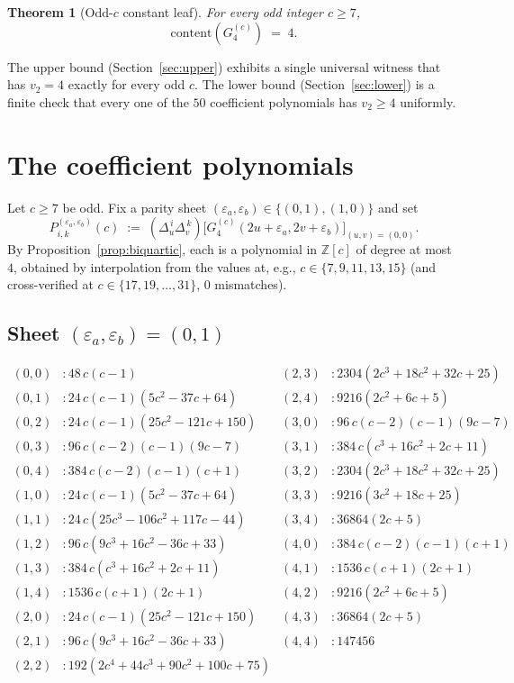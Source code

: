 \documentclass[11pt]{article}
\newtheorem{theorem}{Theorem}
\begin{document}
\begin{theorem}[Odd-$c$ constant leaf]\label{thm:main}
For every odd integer $c \ge 7$,
\[
  \mathrm{content}(G_4^{(c)}) \;=\; 4.
\]
\end{theorem}

The upper bound (Section~\ref{sec:upper}) exhibits a single universal witness
that has $v_2 = 4$ exactly for every odd $c$. The lower bound
(Section~\ref{sec:lower}) is a finite check that every one of the $50$
coefficient polynomials has $v_2 \ge 4$ uniformly.

\section{The coefficient polynomials}\label{sec:coeffs}

Let $c \ge 7$ be odd. Fix a parity sheet
$(\varepsilon_a, \varepsilon_b) \in \{(0,1), (1,0)\}$ and set
\[
  P^{(\varepsilon_a, \varepsilon_b)}_{i,k}(c) \;:=\; (\Delta_u^{\,i} \Delta_v^{\,k})\bigl[G_4^{(c)}(2u+\varepsilon_a, 2v+\varepsilon_b)\bigr]_{(u,v)=(0,0)}.
\]
By Proposition~\ref{prop:biquartic}, each is a polynomial in $\mathbb{Z}[c]$
of degree at most $4$, obtained by interpolation from the values at, e.g.,
$c \in \{7, 9, 11, 13, 15\}$ (and cross-verified at $c \in \{17, 19, \ldots, 31\}$,
$0$ mismatches).

\subsection{Sheet $(\varepsilon_a, \varepsilon_b) = (0,1)$}

\begin{small}
\begin{align*}
(0,0)&: 48\,c(c{-}1) & (2,3)&: 2304(2c^3 + 18c^2 + 32c + 25) \\
(0,1)&: 24\,c(c{-}1)(5c^2 - 37c + 64) & (2,4)&: 9216(2c^2 + 6c + 5) \\
(0,2)&: 24\,c(c{-}1)(25c^2 - 121c + 150) & (3,0)&: 96\,c(c{-}2)(c{-}1)(9c - 7) \\
(0,3)&: 96\,c(c{-}2)(c{-}1)(9c - 7) & (3,1)&: 384\,c(c^3 + 16c^2 + 2c + 11) \\
(0,4)&: 384\,c(c{-}2)(c{-}1)(c{+}1) & (3,2)&: 2304(2c^3 + 18c^2 + 32c + 25) \\
(1,0)&: 24\,c(c{-}1)(5c^2 - 37c + 64) & (3,3)&: 9216(3c^2 + 18c + 25) \\
(1,1)&: 24\,c(25c^3 - 106c^2 + 117c - 44) & (3,4)&: 36864(2c + 5) \\
(1,2)&: 96\,c(9c^3 + 16c^2 - 36c + 33) & (4,0)&: 384\,c(c{-}2)(c{-}1)(c{+}1) \\
(1,3)&: 384\,c(c^3 + 16c^2 + 2c + 11) & (4,1)&: 1536\,c(c{+}1)(2c + 1) \\
(1,4)&: 1536\,c(c{+}1)(2c + 1) & (4,2)&: 9216(2c^2 + 6c + 5) \\
(2,0)&: 24\,c(c{-}1)(25c^2 - 121c + 150) & (4,3)&: 36864(2c + 5) \\
(2,1)&: 96\,c(9c^3 + 16c^2 - 36c + 33) & (4,4)&: 147456 \\
(2,2)&: 192(2c^4 + 44c^3 + 90c^2 + 100c + 75) & &
\end{align*}
\end{small}
\end{document}
